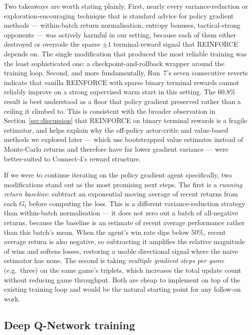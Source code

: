 \documentclass[11pt]{article}
\begin{document}
Two takeaways are worth stating plainly. First, nearly every
variance-reduction or exploration-encouraging technique that is
standard advice for policy gradient methods --- within-batch return
normalisation, entropy bonuses, tactical-strong opponents --- was
actively harmful in our setting, because each of them either
destroyed or overrode the sparse $\pm 1$ terminal-reward signal that
REINFORCE depends on. The single modification that produced the most
reliable training was the least sophisticated one: a
checkpoint-and-rollback wrapper around the training loop. Second,
and more fundamentally, Run~7's seven consecutive reverts indicate
that vanilla REINFORCE with sparse binary terminal rewards cannot
reliably improve on a strong supervised warm start in this setting.
The $60.8\%$ result is best understood as a floor that policy
gradient preserved rather than a ceiling it climbed to. This is
consistent with the broader observation in
Section~\ref{sec:discussion} that REINFORCE on binary terminal
rewards is a fragile estimator, and helps explain why the off-policy
actor-critic and value-based methods we explored later --- which
use bootstrapped value estimates instead of Monte-Carlo returns and
therefore have far lower gradient variance --- were better-suited to
Connect-4's reward structure.

If we were to continue iterating on the policy gradient agent
specifically, two modifications stand out as the most promising next
steps. The first is a \emph{running return baseline}: subtract an
exponential moving average of recent returns from each $G_t$ before
computing the loss. This is a different variance-reduction strategy
than within-batch normalisation --- it does not zero out a batch of
all-negative returns, because the baseline is an estimate of recent
average performance rather than this batch's mean. When the agent's
win rate dips below $50\%$, recent average return is also negative,
so subtracting it amplifies the relative magnitude of wins and
softens losses, restoring a usable directional signal where the
naive estimator has none. The second is taking \emph{multiple
gradient steps per game} (e.g.\ three) on the same game's triplets,
which increases the total update count without reducing game
throughput. Both are cheap to implement on top of the existing
training loop and would be the natural starting point for any
follow-on work.

\subsection{Deep Q-Network training}
\label{ssec:dqn_results}
\end{document}

